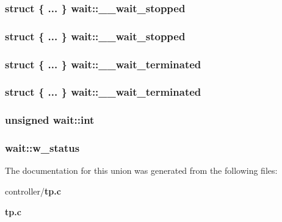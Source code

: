 \subsubsection[{\_\-\_\-wait\_\-stopped}]{\setlength{\rightskip}{0pt plus 5cm}struct \{ ... \}   {\bf wait::\_\-\_\-wait\_\-stopped}}\label{unionwait_a27f3129522eb4276a26bec2dd5ad6dce}
\subsubsection[{\_\-\_\-wait\_\-stopped}]{\setlength{\rightskip}{0pt plus 5cm}struct \{ ... \}   {\bf wait::\_\-\_\-wait\_\-stopped}}\label{unionwait_a79fe4d71807f7807ddb89247e9272c4a}
\subsubsection[{\_\-\_\-wait\_\-terminated}]{\setlength{\rightskip}{0pt plus 5cm}struct \{ ... \}   {\bf wait::\_\-\_\-wait\_\-terminated}}\label{unionwait_a9bfa5a80879a1ffef30438c12f6c2206}
\subsubsection[{\_\-\_\-wait\_\-terminated}]{\setlength{\rightskip}{0pt plus 5cm}struct \{ ... \}   {\bf wait::\_\-\_\-wait\_\-terminated}}\label{unionwait_a27819c744f4fba3b8478046dccfd2a07}
\subsubsection[{int}]{\setlength{\rightskip}{0pt plus 5cm}unsigned {\bf wait::int}}\label{unionwait_abf50f10c736e4c01e439591e7fa8b531}
\subsubsection[{w\_\-status}]{ {\bf wait::w\_\-status}}\label{unionwait_acf7db74d249efc70e36c999def67f51d}


The documentation for this union was generated from the following files:\begin{DoxyCompactItemize}
\item 
controller/{\bf tp.c}\item 
{\bf tp.c}\end{DoxyCompactItemize}
